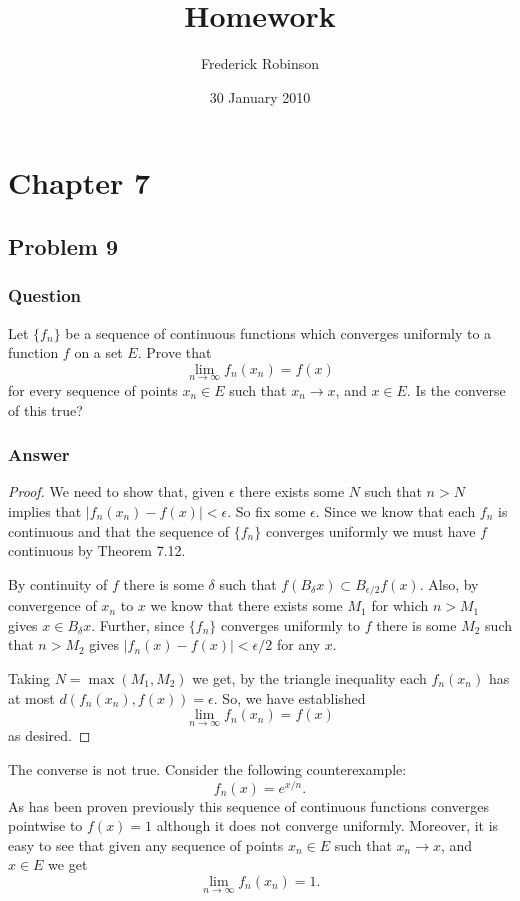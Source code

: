 \documentclass[12pt]{article}
\title{Homework}
\author{Frederick Robinson}
\date{30 January 2010}
\begin{document}

   \maketitle

\setcounter{tocdepth}{2} 


\section{Chapter 7}
\subsection{Problem 9}

\subsubsection{Question}
Let $\{f_n\}$ be a sequence of continuous functions which converges uniformly to a function $f$ on a set $E$. Prove that
\[
\lim_{n \to \infty} f_n(x_n) = f(x)
\]
for every sequence of points $x_n \in E$ such that $x_n \to x$, and $x\in E$. Is the converse of this true?
\subsubsection{Answer}
\begin{proof}
We need to show that, given $\epsilon$ there exists some $N$ such that $n> N$ implies that $|f_n(x_n) - f(x)| < \epsilon$.  So fix some $\epsilon$. Since we know that each $f_n$ is continuous and that the sequence of $\{f_n\}$ converges uniformly we must have $f$ continuous by Theorem 7.12.

By continuity of $f$  there is some $\delta$ such that $f( B_\delta x ) \subset B_{\epsilon/2} f(x) $. Also, by convergence of $x_n$ to $x$ we know that there exists some $M_1$ for which $n>M_1$ gives $x \in B_\delta x$. Further, since $\{f_n\}$ converges uniformly to $f$ there is some $M_2$ such that $n>M_2$ gives $|f_n(x) - f(x)| < \epsilon / 2$ for any $x$.

Taking $N  = \max{(M_1,M_2)}$ we get, by the triangle inequality each $f_n(x_n)$ has at most $d(f_n(x_n),f(x)) = \epsilon$. So, we have established 
\[
\lim_{n \to \infty} f_n(x_n) = f(x)
\]
as desired.
\end{proof}

The converse is not true. Consider the following counterexample:
\[f_n(x) = e^{ x / n}.\]
As has been proven previously this sequence of continuous functions converges pointwise to $f(x)=1$ although it does not converge uniformly. Moreover, it is easy to see that given any sequence of points $x_n \in E$ such that $x_n \to x$, and $x\in E$ we get 
\[\lim_{n \to \infty} f_n(x_n) = 1.\]
\end{document}

